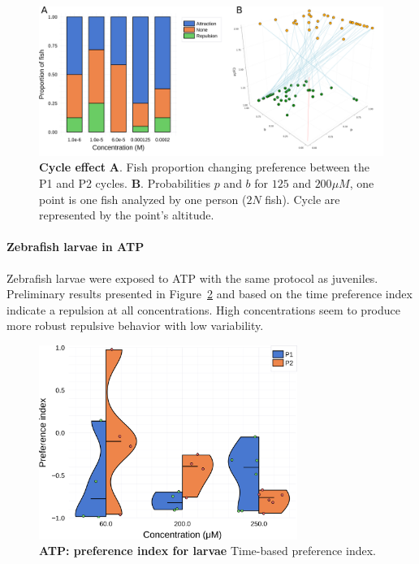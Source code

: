    \begin{figure}[h!]
      \centering
      \includegraphics[width=1\textwidth]{part_2/assets/proportion.png}
      \caption{\textbf{Cycle effect} \textbf{A}. Fish proportion changing preference between the P1 and P2 cycles. \textbf{B}. Probabilities $p$ and $b$ for $125$ and $200 \mu M$, one point is one fish analyzed by one person ($2N$ fish). Cycle are represented by the point's altitude.}
      \label{proportion}
    \end{figure}

    \paragraph{Zebrafish larvae in ATP} Zebrafish larvae were exposed to ATP with the same protocol as juveniles. Preliminary results presented in Figure~\ref{dist_atp_lar} and based on the time preference index indicate a repulsion at all concentrations. High concentrations seem to produce more robust repulsive behavior with low variability.

    \begin{figure}[h!]
      \centering
      \includegraphics[width=0.75\textwidth]{part_2/assets/dist_atp_lar.png}
      \caption{\textbf{ATP: preference index for larvae} Time-based preference index. }
      \label{dist_atp_lar}
    \end{figure}

